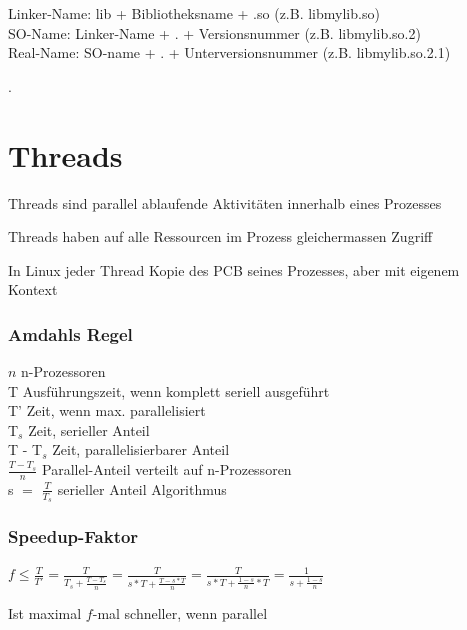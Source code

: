 \begin{multicols*}{5}
\textcolor{h}{Linker-Name}: lib + Bibliotheksname + .so (z.B. libmylib.so)\\
\textcolor{h}{SO-Name:} Linker-Name + . + Versionsnummer (z.B. libmylib.so.2)\\
\textcolor{h}{Real-Name:} SO-name + . + Unterversionsnummer (z.B. libmylib.so.2.1) 
	
\vspace{180pt}
.
\vfill
\columnbreak









\section{Threads}
	\begin{compactitem}[$\bullet$]
		\item Threads sind parallel ablaufende Aktivitäten innerhalb eines Prozesses
		\item Threads haben auf alle Ressourcen im Prozess gleichermassen Zugriff
		\item In Linux jeder Thread Kopie des PCB seines Prozesses, aber mit eigenem Kontext
	\end{compactitem}
	
	
	\subsubsection{Amdahls Regel}
	$n$ n-Prozessoren\\
	T Ausführungszeit, wenn komplett seriell ausgeführt\\
	T' Zeit, wenn max. parallelisiert\\
	T$_{s}$ Zeit, serieller Anteil\\
	T - T$_{s}$ Zeit, parallelisierbarer Anteil\\
	$\frac{T - T_{s}}{n}$  Parallel-Anteil verteilt auf n-Prozessoren\\
	s $=$ $\frac{T}{T_{s}}$ serieller Anteil Algorithmus
	
	\subsubsection{Speedup-Faktor}
	$f \leq \frac{T}{T'} = \frac{T}{T_{s} + \frac{T - T_s}{n}} = \frac{T}{s * T + \frac{T - s * T}{n}} = \frac{T}{s * T + \frac{1 - s}{n} * T} = \frac{1}{s + \frac{1 - s}{n}}$

	Ist maximal $f$-mal schneller, wenn parallel





\end{multicols*}
